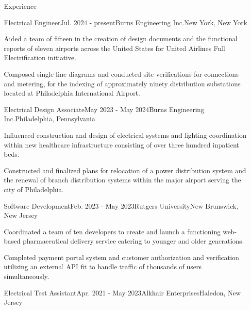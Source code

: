 \documentclass{resume}
\begin{document}

    \begin{rSection}{Experience}
        \begin{rSubsection}{Electrical Engineer}{Jul. 2024 - present}{Burns Engineering Inc.}{New York, New York}
            \item Aided a team of fifteen in the creation of design documents and the functional reports of eleven airports across the United States for United Airlines Full Electrification initiative.
            \item Composed single line diagrams and conducted site
                verifications for connections and metering, for the indexing of
                approximately ninety distribution substations located at
                Philadelphia International Airport.
        \end{rSubsection}
        \begin{rSubsection}{Electrical Design Associate}{May 2023 - May 2024}{Burns Engineering Inc.}{Philadelphia, Pennsylvania}
            \item Influenced construction and design of electrical systems
                and lighting coordination within new healthcare infrastructure
                consisting of over three hundred inpatient beds.
            \item Constructed and finalized plans for relocation of a power
                distribution system and the renewal of branch distribution
                systems within the major airport serving the city of
                Philadelphia.
        \end{rSubsection}
        \begin{rSubsection}{Software Development}{Feb. 2023 - May 2023}{Rutgers University}{New Brunswick, New Jersey}
            \item Coordinated a team of ten developers to create and launch a
                functioning web-based pharmaceutical delivery service catering
                to younger and older generations.
            \item Completed payment portal system and customer authorization
                and verification utilizing an external API fit to handle
                traffic of thousands of users simultaneously.
        \end{rSubsection}
        \begin{rSubsection}{Electrical Test Assistant}{Apr. 2021 - May 2023}{Alkhair Enterprises}{Haledon, New Jersey}

\end{rSubsection}
\end{rSection}
\end{document}
